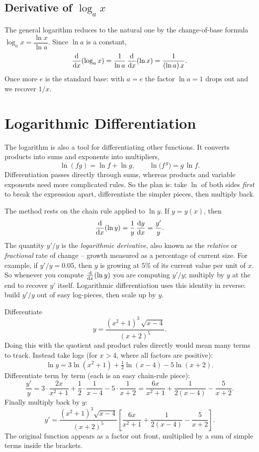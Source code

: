 \subsection{Derivative of $\log_a x$}

The general logarithm reduces to the natural one by the change-of-base
formula $\log_a x = \dfrac{\ln x}{\ln a}$. Since $\ln a$ is a constant,
\[
   \frac{\mathrm{d}}{\mathrm{d} x}\!\left(\log_a x\right)
   = \frac{1}{\ln a}\,\frac{\mathrm{d}}{\mathrm{d} x}\!\left(\ln x\right)
   = \frac{1}{(\ln a)\,x}.
\]
Once more $e$ is the standard base: with $a=e$ the factor $\ln a=1$ drops out
and we recover $1/x$.

\section{Logarithmic Differentiation}
\label{ch12:logdiff}

The logarithm is also a tool for differentiating other functions. It
converts products into sums and exponents into multipliers,
\[
   \ln(fg) = \ln f + \ln g,
   \qquad
   \ln\!\big(f^{\,g}\big) = g\,\ln f.
\]
Differentiation passes directly through sums, whereas products and variable
exponents need more complicated rules. So
the plan is: take $\ln$ of both sides \emph{first} to break the expression apart,
differentiate the simpler pieces, then multiply back.

\begin{whybox}
The method rests on the chain rule applied to $\ln y$. If $y=y(x)$, then
\[
   \frac{\mathrm{d}}{\mathrm{d} x}\!\left(\ln y\right) = \frac{1}{y}\,\frac{\mathrm{d} y}{\mathrm{d} x} = \frac{y'}{y}.
\]
The quantity $y'/y$ is the \emph{logarithmic derivative}, also known as the
\emph{relative} or \emph{fractional} rate of change -- growth measured as a
percentage of current size. For example, if $y'/y = 0.05$, then $y$ is
growing at $5\%$ of its current value per unit of $x$. So whenever you
compute $\frac{\mathrm{d}}{\mathrm{d} x}\!\left(\ln y\right)$ you are computing $y'/y$; multiply by $y$ at the end to
recover $y'$ itself. Logarithmic differentiation uses this identity in reverse:
build $y'/y$ out of easy log-pieces, then scale up by $y$.
\end{whybox}

\begin{example}
\label{ch12:ex-logdiff-product}
Differentiate
\[
   y = \frac{(x^2+1)^3\,\sqrt{x-4}}{(x+2)^5}.
\]
Doing this with the quotient and product rules directly would mean many
terms to track. Instead take logs (for $x>4$, where all factors are positive):
\[
   \ln y = 3\ln(x^2+1) + \tfrac12\ln(x-4) - 5\ln(x+2).
\]
Differentiate term by term (each is an easy chain-rule piece):
\[
   \frac{y'}{y}
   = 3\cdot\frac{2x}{x^2+1} + \frac12\cdot\frac{1}{x-4} - 5\cdot\frac{1}{x+2}
   = \frac{6x}{x^2+1} + \frac{1}{2(x-4)} - \frac{5}{x+2}.
\]
Finally multiply back by $y$:
\[
   y' = \frac{(x^2+1)^3\sqrt{x-4}}{(x+2)^5}
        \left[\frac{6x}{x^2+1} + \frac{1}{2(x-4)} - \frac{5}{x+2}\right].
\]
The original function appears as a factor out front, multiplied by a
sum of simple terms inside the brackets.
\end{example}

